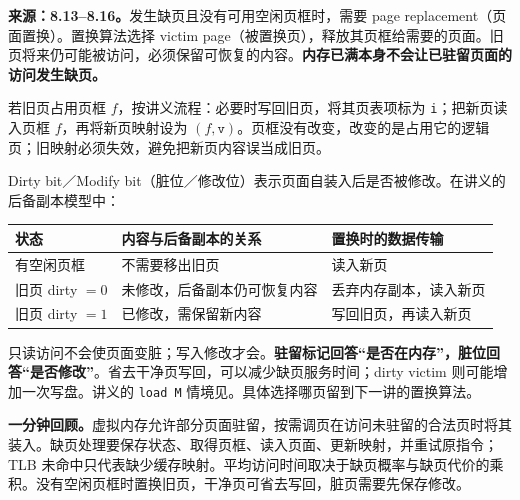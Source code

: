 
\textbf{来源：8.13--8.16。}发生缺页且没有可用空闲页框时，需要 page replacement（页面置换）。置换算法选择 victim page（被置换页），释放其页框给需要的页面。旧页将来仍可能被访问，必须保留可恢复的内容。\textbf{内存已满本身不会让已驻留页面的访问发生缺页。}

若旧页占用页框 $f$，按讲义流程：必要时写回旧页，将其页表项标为 \texttt{i}；把新页读入页框 $f$，再将新页映射设为 $(f,\texttt{v})$。页框没有改变，改变的是占用它的逻辑页；旧映射必须失效，避免把新页内容误当成旧页。

Dirty bit／Modify bit（脏位／修改位）表示页面自装入后是否被修改。在讲义的后备副本模型中：
\begin{center}
\begin{tabularx}{\textwidth}{@{}l>{\raggedright\arraybackslash}X>{\raggedright\arraybackslash}X@{}}
\toprule
状态 & 内容与后备副本的关系 & 置换时的数据传输 \\
\midrule
有空闲页框 & 不需要移出旧页 & 读入新页 \\
旧页 dirty $=0$ & 未修改，后备副本仍可恢复内容 & 丢弃内存副本，读入新页 \\
旧页 dirty $=1$ & 已修改，需保留新内容 & 写回旧页，再读入新页 \\
\bottomrule
\end{tabularx}
\end{center}

只读访问不会使页面变脏；写入修改才会。\textbf{驻留标记回答“是否在内存”，脏位回答“是否修改”}。省去干净页写回，可以减少缺页服务时间；dirty victim 则可能增加一次写盘。讲义的 \texttt{load M} 情境见。具体选择哪页留到下一讲的置换算法。

\textbf{一分钟回顾。}虚拟内存允许部分页面驻留，按需调页在访问未驻留的合法页时将其装入。缺页处理要保存状态、取得页框、读入页面、更新映射，并重试原指令；TLB 未命中只代表缺少缓存映射。平均访问时间取决于缺页概率与缺页代价的乘积。没有空闲页框时置换旧页，干净页可省去写回，脏页需要先保存修改。
\endgroup
